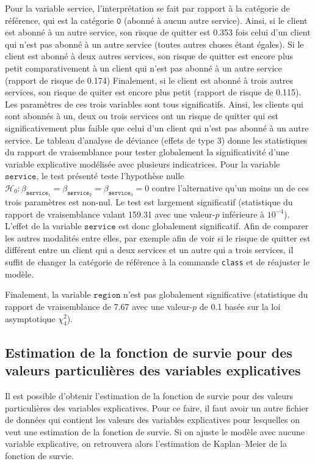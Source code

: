 \documentclass[
  11pt,
  letterpaper,
]{scrbook}
\theoremstyle{definition}
\theoremstyle{remark}
\begin{document}
Pour la variable service, l'interprétation se fait par rapport à la
catégorie de référence, qui est la catégorie \(\texttt{0}\) (abonné à
aucun autre service). Ainsi, si le client est abonné à un autre service,
son risque de quitter est 0.353 fois celui d'un client qui n'est pas
abonné à un autre service (toutes autres choses étant égales). Si le
client est abonné à deux autres services, son risque de quitter est
encore plus petit comparativement à un client qui n'est pas abonné à un
autre service (rapport de risque de 0.174) Finalement, si le client est
abonné à trois autres services, son risque de quiter est encore plus
petit (rapport de risque de 0.115). Les paramètres de ces trois
variables sont tous significatifs. Ainsi, les clients qui sont abonnés à
un, deux ou trois services ont un risque de quitter qui est
significativement plus faible que celui d'un client qui n'est pas abonné
à un autre service. Le tableau d'analyse de déviance (effets de type 3)
donne les statistiques du rapport de vraisemblance pour tester
globalement la significativité d'une variable explicative modélisée avec
plusieurs indicatrices. Pour la variable \(\texttt{service}\), le test
présenté teste l'hypothèse nulle
\(\mathscr{H}_0: \beta_{\texttt{service}_1}=\beta_{\texttt{service}_2}=\beta_{\texttt{service}_3}=0\)
contre l'alternative qu'un moins un de ces trois paramètres est non-nul.
Le test est largement significatif (statistique du rapport de
vraisemblance valant 159.31 avec une valeur-\(p\) inférieure à
\(10^{-4}\)). L'effet de la variable \(\texttt{service}\) est donc
globalement significatif. Afin de comparer les autres modalités entre
elles, par exemple afin de voir si le risque de quitter est différent
entre un client qui a deux services et un autre qui a trois services, il
suffit de changer la catégorie de référence à la commande \texttt{class}
et de réajuster le modèle.

Finalement, la variable \(\texttt{region}\) n'est pas globalement
significative (statistique du rapport de vraisemblance de 7.67 avec une
valeur-\(p\) de 0.1 basée sur la loi asymptotique \(\chi^2_4\)).

\subsection{Estimation de la fonction de survie pour des valeurs
particulières des variables
explicatives}\label{estimation-de-la-fonction-de-survie-pour-des-valeurs-particuliuxe8res-des-variables-explicatives}

Il est possible d'obtenir l'estimation de la fonction de survie pour des
valeurs particulières des variables explicatives. Pour ce faire, il faut
avoir un autre fichier de données qui contient les valeurs des variables
explicatives pour lesquelles on veut une estimation de la fonction de
survie. Si on ajuste le modèle avec aucune variable explicative, on
retrouvera alors l'estimation de Kaplan--Meier de la fonction de survie.
\end{document}
